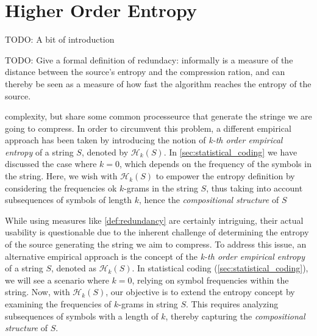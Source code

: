 \clearpage
\section{Higher Order Entropy} \label{sec:higher_order_entropy}

TODO: A bit of introduction
\begin{definition}[Redundacy] \label{def:redundancy}
    TODO: Give a formal definition of redundacy: informally is a measure of the distance between the source's entropy and the compression ration, and can thereby be seen as a measure of how fast the algorithm reaches the entropy of the source.
\end{definition}

complexity, but share some common processeurce that generate the stringe we are going to compress. In order to circumvent this problem, a different empirical approach has been taken by introducing the notion of \emph{k-th order empirical entropy} of a string $S$, denoted by $\mathcal{H}_k(S)$. In \ref{sec:statistical_coding} we have discussed the case where $k=0$, which depends on the frequency of the symbols in the string. Here, we wish with $\mathcal{H}_k(S)$ to empower the entropy definition by considering the frequencies ok $k$-grams in the string $S$, thus taking into account subsequences of symbols of length $k$, hence the \emph{compositional structure} of $S$

\noindent While using measures like \ref{def:redundancy} are certainly intriguing, their actual usability is questionable due to the inherent challenge of determining the entropy of the source generating the string we aim to compress. To address this issue, an alternative empirical approach is the concept of the \emph{k-th order empirical entropy} of a string $S$, denoted as $\mathcal{H}_k(S)$. In statistical coding (\autoref{sec:statistical_coding}), we will see a scenario where $k=0$, relying on symbol frequencies within the string. Now, with $\mathcal{H}_k(S)$, our objective is to extend the entropy concept by examining the frequencies of $k$-grams in string $S$. This requires analyzing subsequences of symbols with a length of $k$, thereby capturing the \emph{compositional structure} of $S$. \cite{ferragina2023pearls} \vspace{0.4cm}

